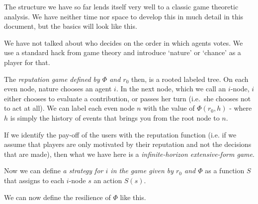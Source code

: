 \documentclass{article}
\newcommand{\flow}{\Phi}
\begin{document}


The structure we have so far lends itself very well to a classic game theoretic analysis. We have neither time nor space to develop this in much detail in this document, but the basics will look like this.


We have not talked about who decides on the order in which agents votes. We use a standard hack from game theory and introduce `nature' or `chance' as a player for that.

The {\em reputation game defined by $\flow$ and $r_0$} then, is a rooted labeled tree. On each even node, nature chooses an agent $i$. In the next node, which we call an $i$-node, $i$ either chooses to evaluate a contribution, or passes her turn (i.e.\ she chooses not to act at all). 
We can label each even node $n$ with the value of $\flow(r_0, h)$ - where $h$ is simply the history of events that brings you from the root node to $n$.

If we identify the pay-off of the users with the reputation function (i.e. if we assume that players are only motivated by their reputation and not the decisions that are made), then what we have here is a {\em infinite-horizon extensive-form game}.

Now we can define {\em a strategy for $i$ in the game given by $r_0$ and $\flow$} as a function $S$ that assigns to each $i$-node $s$ an action $S(s)$.

We can now define the resilience of $\Phi$ like this. 
\end{document}

